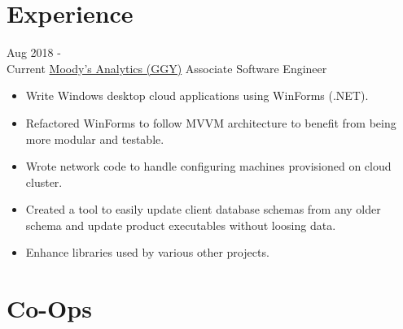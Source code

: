 \documentclass[letterpaper]{twentysecondcv} %
\begin{document}
\makeprofile %


\section{Experience}

\begin{twenty} %
		\twentyitem
    	{Aug 2018 -\\Current}
        {\href{https://www.ggy.com/}{Moody's Analytics (GGY)}}
        {Associate Software Engineer}
        {}
        {
        {\begin{itemize}
        \item Write Windows desktop cloud applications using WinForms (.NET).
        \item Refactored WinForms to follow MVVM architecture to benefit from being more modular and testable.
        \item Wrote network code to handle configuring machines provisioned on cloud cluster.
        \item Created a tool to easily update client database schemas from any older schema and update product executables without loosing data.
        \item Enhance libraries used by various other projects.
    \end{itemize}}
        }
\end{twenty}

\section{Co-Ops}
\end{document}
